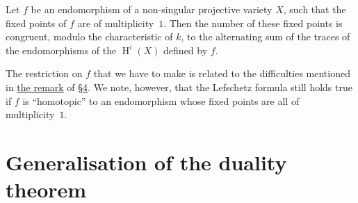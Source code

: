 \documentclass{article}
\theoremstyle{plain}
\newenvironment{theorem}[1]
  {\renewcommand\theinnertheorem{#1}\innertheorem}
  {\endinnertheorem}
\theoremstyle{definition}
\DeclareMathOperator{\HH}{H}
\begin{document}
\begin{theorem}{5}
\label{theorem5}
  Let $f$ be an endomorphism of a non-singular projective variety $X$, such that the fixed points of $f$ are of multiplicity~$1$.
  Then the number of these fixed points is congruent, modulo the characteristic of $k$, to the alternating sum of the traces of the endomorphisms of the $\HH^i(X)$ defined by $f$.
\end{theorem}

The restriction on $f$ that we have to make is related to the difficulties mentioned in \hyperref[section4remark]{the remark} of \hyperref[section4]{\S4}.
We note, however, that the Lefschetz formula still holds true if $f$ is ``homotopic'' to an endomorphism whose fixed points are all of multiplicity~$1$.


\section{Generalisation of the duality theorem}
\label{section8}
\end{document}

